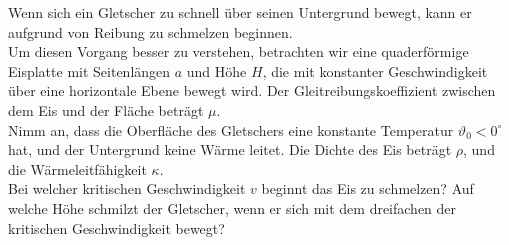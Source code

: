 \begin{Exercise}[label = glacier, origin = {Orpheus-Seminar 2014, Lucas Rettenmeier}, difficulty = 3, title = Gletscherschmelze]
Wenn sich ein Gletscher zu schnell über seinen Untergrund bewegt, kann er aufgrund von Reibung zu schmelzen beginnen. \\
Um diesen Vorgang besser zu verstehen, betrachten wir eine quaderförmige Eisplatte mit Seitenlängen $a$ und Höhe $H$, die mit konstanter Geschwindigkeit über eine horizontale Ebene bewegt wird. Der Gleitreibungskoeffizient zwischen dem Eis und der Fläche beträgt $\mu$.\\
Nimm an, dass die Oberfläche des Gletschers eine konstante Temperatur $\vartheta_0 <0^\circ$ hat, und der Untergrund keine Wärme leitet. Die Dichte des Eis beträgt $\rho$, und die Wärmeleitfähigkeit $\kappa$. \\
Bei welcher kritischen Geschwindigkeit $v$ beginnt das Eis zu schmelzen? Auf welche Höhe schmilzt der Gletscher, wenn er sich mit dem dreifachen der kritischen Geschwindigkeit bewegt?
\end{Exercise}
